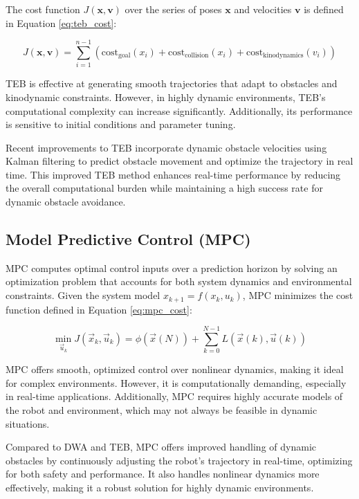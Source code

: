 \documentclass[conference]{IEEEtran}
\begin{document}
The cost function \(J(\mathbf{x}, \mathbf{v})\) over the series of poses \(\mathbf{x}\) and velocities \(\mathbf{v}\) is defined in Equation \eqref{eq:teb_cost}:

\begin{equation}
\label{eq:teb_cost}
J(\mathbf{x}, \mathbf{v}) = \sum_{i=1}^{n-1} \left( \text{cost}_{\text{goal}}(x_i) + \text{cost}_{\text{collision}}(x_i) + \text{cost}_{\text{kinodynamics}}(v_i) \right)
\end{equation}

TEB is effective at generating smooth trajectories that adapt to obstacles and kinodynamic constraints. However, in highly dynamic environments, TEB's computational complexity can increase significantly. Additionally, its performance is sensitive to initial conditions and parameter tuning.

Recent improvements to TEB incorporate dynamic obstacle velocities using Kalman filtering to predict obstacle movement and optimize the trajectory in real time. This improved TEB method \cite{chen2021dynamic} enhances real-time performance by reducing the overall computational burden while maintaining a high success rate for dynamic obstacle avoidance.

\subsection{Model Predictive Control (MPC)}
MPC computes optimal control inputs over a prediction horizon by solving an optimization problem that accounts for both system dynamics and environmental constraints. Given the system model \(x_{k+1} = f(x_k, u_k)\), MPC minimizes the cost function defined in Equation \eqref{eq:mpc_cost}:

\begin{equation}
\min_{\vec{u}_k} J(\vec{x}_k, \vec{u}_k) = \phi(\vec{x}(N)) + \sum_{k=0}^{N-1} L(\vec{x}(k), \vec{u}(k))
\end{equation}

MPC offers smooth, optimized control over nonlinear dynamics, making it ideal for complex environments. However, it is computationally demanding, especially in real-time applications. Additionally, MPC requires highly accurate models of the robot and environment, which may not always be feasible in dynamic situations.

Compared to DWA and TEB, MPC offers improved handling of dynamic obstacles by continuously adjusting the robot's trajectory in real-time, optimizing for both safety and performance. It also handles nonlinear dynamics more effectively, making it a robust solution for highly dynamic environments.
\end{document}
